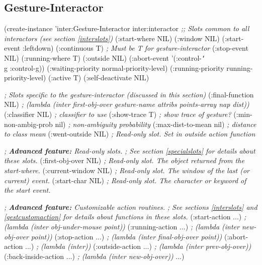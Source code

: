 \begin{group}
\section{Gesture-Interactor}
\label{gesture}

\begin{programexample}
(create-instance 'inter:Gesture-Interactor inter:interactor
  {\it ;; Slots common to all interactors (see section \ref{interslots})}
  (:start-where NIL)
  (:window NIL)
  (:start-event :leftdown)
  (:continuous T)                {\it ; Must be T for gesture-interactor}
  (:stop-event NIL)
  (:running-where T)
  (:outside NIL)
  (:abort-event '(:control-{\tt\char`\\}g :control-g))
  (:waiting-priority normal-priority-level)
  (:running-priority running-priority-level)
  (:active T)
  (:self-deactivate NIL)

  {\it ; Slots specific to the gesture-interactor (discussed in this section)}
  (:final-function NIL)          {\it ; (lambda (inter first-obj-over gesture-name attribs points-array nap dist))}
  (:classifier NIL)              {\it ; classifier to use}
  (:show-trace T)                {\it ; show trace of gesture?}
  (:min-non-ambig-prob nil)      {\it ; non-ambiguity probability}
  (:max-dist-to-mean nil)        {\it ; distance to class mean}
  (:went-outside NIL)            {\it ; Read-only slot.  Set in outside action function}

  {\it ; {\bf Advanced feature:}  Read-only slots.}
  {\it ; See section \ref{specialslots} for details about these slots.}
  (:first-obj-over NIL)     {\it ; Read-only slot.  The object returned from the start-where.}
  (:current-window NIL)     {\it ; Read-only slot.  The window of the last (or current) event.}
  (:start-char NIL)         {\it ; Read-only slot.  The character or keyword of the start event.}

  {\it ; {\bf Advanced feature:} Customizable action routines.}
  {\it ; See sections \ref{interslots} and \ref{gestcustomaction} for details about functions in these slots.}
  (:start-action ...)       {\it ; (lambda (inter obj-under-mouse point))}
  (:running-action ...)     {\it ; (lambda (inter new-obj-over point))}
  (:stop-action ...)        {\it ; (lambda (inter final-obj-over point))}
  (:abort-action ...)       {\it ; (lambda (inter))}
  (:outside-action ...)     {\it ; (lambda (inter prev-obj-over))}
  (:back-inside-action ...) {\it ; (lambda (inter new-obj-over))}
...)
\end{programexample}
\end{group}


